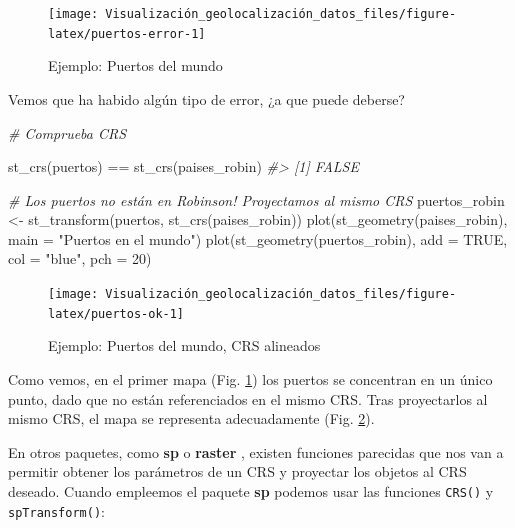 \documentclass[
]{report}
\newenvironment{Shaded}{\begin{snugshade}}{\end{snugshade}}
\newcommand{\AttributeTok}[1]{\textcolor[rgb]{0.77,0.63,0.00}{#1}}
\newcommand{\CommentTok}[1]{\textcolor[rgb]{0.56,0.35,0.01}{\textit{#1}}}
\newcommand{\ConstantTok}[1]{\textcolor[rgb]{0.00,0.00,0.00}{#1}}
\newcommand{\DecValTok}[1]{\textcolor[rgb]{0.00,0.00,0.81}{#1}}
\newcommand{\FunctionTok}[1]{\textcolor[rgb]{0.00,0.00,0.00}{#1}}
\newcommand{\NormalTok}[1]{#1}
\newcommand{\OtherTok}[1]{\textcolor[rgb]{0.56,0.35,0.01}{#1}}
\newcommand{\SpecialCharTok}[1]{\textcolor[rgb]{0.00,0.00,0.00}{#1}}
\newcommand{\StringTok}[1]{\textcolor[rgb]{0.31,0.60,0.02}{#1}}
\theoremstyle{definition}
\theoremstyle{definition}
\theoremstyle{definition}
\theoremstyle{definition}
\theoremstyle{remark}
\begin{document}
\begin{figure}

{\centering \texttt{[image: Visualización\_geolocalización\_datos\_files/figure-latex/puertos-error-1]} 

}

\caption{Ejemplo: Puertos del mundo}\label{fig:puertos-error}
\end{figure}

Vemos que ha habido algún tipo de error, ¿a que puede deberse?

\begin{Shaded}
\begin{Highlighting}[]
\CommentTok{\# Comprueba CRS}

\FunctionTok{st\_crs}\NormalTok{(puertos) }\SpecialCharTok{==} \FunctionTok{st\_crs}\NormalTok{(paises\_robin)}
\CommentTok{\#\textgreater{} [1] FALSE}

\CommentTok{\# Los puertos no están en Robinson! Proyectamos al mismo CRS}
\NormalTok{puertos\_robin }\OtherTok{\textless{}{-}} \FunctionTok{st\_transform}\NormalTok{(puertos, }\FunctionTok{st\_crs}\NormalTok{(paises\_robin))}
\FunctionTok{plot}\NormalTok{(}\FunctionTok{st\_geometry}\NormalTok{(paises\_robin), }\AttributeTok{main =} \StringTok{"Puertos en el mundo"}\NormalTok{)}
\FunctionTok{plot}\NormalTok{(}\FunctionTok{st\_geometry}\NormalTok{(puertos\_robin), }\AttributeTok{add =} \ConstantTok{TRUE}\NormalTok{, }\AttributeTok{col =} \StringTok{"blue"}\NormalTok{, }\AttributeTok{pch =} \DecValTok{20}\NormalTok{)}
\end{Highlighting}
\end{Shaded}

\begin{figure}

{\centering \texttt{[image: Visualización\_geolocalización\_datos\_files/figure-latex/puertos-ok-1]} 

}

\caption{Ejemplo: Puertos del mundo, CRS alineados}\label{fig:puertos-ok}
\end{figure}

Como vemos, en el primer mapa (Fig. \ref{fig:puertos-error}) los puertos se
concentran en un único punto, dado que no están referenciados en el mismo CRS.
Tras proyectarlos al mismo CRS, el mapa se representa adecuadamente (Fig.
\ref{fig:puertos-ok}).

En otros paquetes, como \textbf{sp} \citep{R-sp} o \textbf{raster} \citep{R-raster}, existen
funciones parecidas que nos van a permitir obtener los parámetros de un CRS y
proyectar los objetos al CRS deseado. Cuando empleemos el paquete \textbf{sp} podemos
usar las funciones \texttt{CRS()} y \texttt{spTransform()}:
\end{document}
